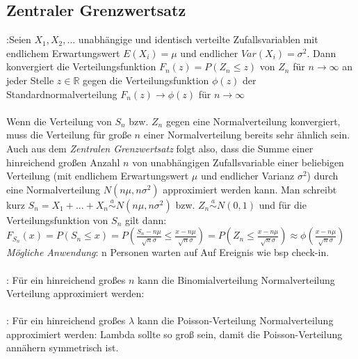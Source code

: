 \subsection{Zentraler Grenzwertsatz}
:Seien $X_1, X_2, ...$ unabhängige und identisch verteilte Zufallsvariablen mit endlichem Erwartungswert $E(X_i) = \mu$ und endlicher $Var(X_i) = \sigma^2$. Dann konvergiert die Verteilungsfunktion $F_n(z) = P(Z_n \le z)$ von $Z_n$ für $n \rightarrow \infty$ an jeder Stelle $z \in \mathds{R}$ gegen die Verteilungsfunktion $\phi(z)$ der Standardnormalverteilung $F_n(z) \rightarrow \phi(z)$ für $n \rightarrow \infty$\\\\
Wenn die Verteilung von $S_n$ bzw. $Z_n$ gegen eine Normalverteilung konvergiert, muss die Verteilung für große $n$ einer Normalverteilung bereits sehr ähnlich sein. Auch aus dem \emph{Zentralen Grenzwertsatz} folgt also, dass die Summe einer hinreichend großen Anzahl $n$ von unabhängigen Zufallsvariable einer beliebigen Verteilung (mit endlichem Erwartungswert $\mu$ und endlicher Varianz $\sigma^2$) durch eine Normalverteilung $N(n\mu, n\sigma^2)$ approximiert werden kann. Man schreibt kurz $S_n = X_1 + ... + X_n \overset{a}{\sim} N(n\mu, n\sigma^2)$ bzw. $Z_n \overset{a}{\sim} N(0, 1)$ und für die Verteilungsfunktion von $S_n$ gilt dann: $F_{S_n}(x) = P(S_n \le x) = P(\frac{S_n - n\mu}{\sqrt{n}\sigma} \le \frac{x - n\mu}{\sqrt{n}\sigma}) = P(Z_n \le \frac{x - n\mu}{\sqrt{n}\sigma}) \approx \phi(\frac{x - n\mu}{\sqrt{n}\sigma})$
\emph{Mögliche Anwendung}: n Personen warten auf Auf Ereignis wie bsp check-in.\\\\
: Für ein hinreichend großes $n$ kann die Binomialverteilung Normalverteilung Verteilung approximiert werden:\\\\
: Für ein hinreichend großes $\lambda$ kann die Poisson-Verteilung Normalverteilung approximiert werden: Lambda sollte so groß sein, damit die Poisson-Verteilung annähern symmetrisch ist.\\
